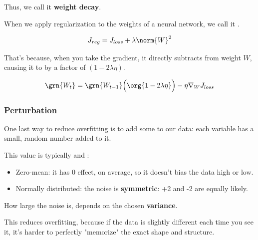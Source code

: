            Thus, we call it \textbf{weight decay}.\\

            \begin{concept}
                When we apply  regularization to the weights of a neural network, we call it .

                \begin{equation*}
                    J_{reg} = J_{loss} + \lambda \norm{W}^2
                \end{equation*}

                That's because, when you take the gradient, it directly subtracts from weight $W$, causing it to  by a factor of $(1-2\lambda \eta)$.

                \begin{equation*}
                    \grn{W_t} = 
                    \grn{W_{t-1}} \Big( \org{ 1 -  2\lambda \eta } \Big)  - 
                         \eta \nabla_W J_{loss} 
                \end{equation*}
            \end{concept}

        \subsubsection{Perturbation}

            One last way to reduce overfitting is to add some  to our data: each variable has a small, random number added to it.

            This value is typically  and :

            \begin{itemize}
                \item Zero-mean: it has 0 effect, on average, so it doesn't bias the data high or low.
                \item Normally distributed: the noise is \textbf{symmetric}: +2 and -2 are equally likely.
            \end{itemize}

            How large the noise is, depends on the chosen \textbf{variance}.
            
            This reduces overfitting, because if the data is slightly different each time you see it, it's harder to perfectly "memorize" the exact shape and structure.\\

